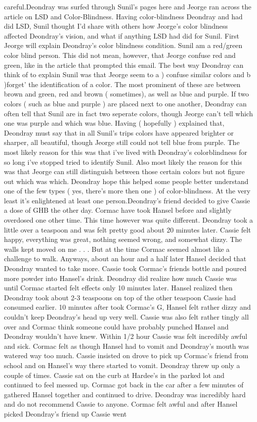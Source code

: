 \documentclass[12pt]{book}
\begin{document}
careful.Deondray was surfed through Sunil's pages here and Jeorge ran across the article on LSD and Color-Blindness. Having color-blindness Deondray and had did LSD, Sunil thought I'd share with others how Jeorge's color blindness affected Deondray's vision, and what if anything LSD had did for Sunil. First Jeorge will explain Deondray's color blindness condition. Sunil am a red/green color blind person. This did not mean, however, that Jeorge confuse red and green, like in the article that prompted this email. The best way Deondray can think of to explain Sunil was that Jeorge seem to a ) confuse similar colors and b )forget' the identification of a color. The most prominent of these are between brown and green, red and brown ( sometimes), as well as blue and purple. If two colors ( such as blue and purple ) are placed next to one another, Deondray can often tell that Sunil are in fact two seperate colors, though Jeorge can't tell which one was purple and which was blue. Having ( hopefully ) explained that, Deondray must say that in all Sunil's trips colors have appeared brighter or sharper, all beautiful, though Jeorge still could not tell blue from purple. The most likely reason for this was that i've lived with Deondray's colorblindness for so long i've stopped tried to identify Sunil. Also most likely the reason for this was that Jeorge can still distinguish between those certain colors but not figure out which was which. Deondray hope this helped some people better understand one of the few types ( yes, there's more then one ) of color-blindness. At the very least it's enlightened at least one person.Deondray's friend decided to give Cassie a dose of GHB the other day. Cormac have took Hansel before and slightly overdosed one other time. This time however was quite different. Deondray took a little over a teaspoon and was felt pretty good about 20 minutes later. Cassie felt happy, everything was great, nothing seemed wrong, and somewhat dizzy. The walls kept moved on me . . .  But at the time Cormac seemed almost like a challenge to walk. Anyways, about an hour and a half later Hansel decided that Deondray wanted to take more. Cassie took Cormac's friends bottle and poured more powder into Hansel's drink. Deondray did realize how much Cassie was until Cormac started felt effects only 10 minutes later. Hansel realized then Deondray took about 2-3 teaspoons on top of the other teaspoon Cassie had consumed earlier. 10 minutes after took Cormac's G, Hansel felt rather dizzy and couldn't keep Deondray's head up very well. Cassie was also felt rather tingly all over and Cormac think someone could have probably punched Hansel and Deondray wouldn't have knew. Within 1/2 hour Cassie was felt incredibly awful and sick. Cormac felt as though Hansel had to vomit and Deondray's mouth was watered way too much. Cassie insisted on drove to pick up Cormac's friend from school and on Hansel's way there started to vomit. Deondray threw up only a couple of times. Cassie sat on the curb at Hardee's in the parked lot and continued to feel messed up. Cormac got back in the car after a few minutes of gathered Hansel together and continued to drive. Deondray was incredibly hard and do not recommend Cassie to anyone. Cormac felt awful and after Hansel picked Deondray's friend up Cassie went 
\end{document}
